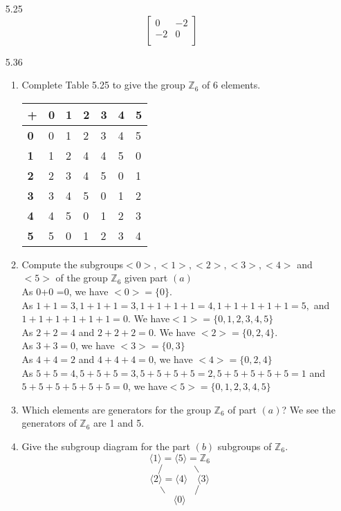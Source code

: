 \documentclass[12pt]{article}
\newcommand{\Z}{\mathds{Z}}
\begin{document}
\begin{enumerate}
		\item[5.25] \[
		\begin{bmatrix}
		0   & -2 \\
		-2   & 0 \\
		\end{bmatrix}
		\]
		\item[5.36] \begin{enumerate}
			\item Complete Table 5.25 to give the group $\Z_6$ of 6 elements.
			\begin{table}[]
				\begin{tabular}{|l|l|l|l|l|l|l|}
					\hline
					+ & \textbf{0} & \textbf{1} & \textbf{2} & \textbf{3} & \textbf{4} & \textbf{5} \\ \hline
					\textbf{0} & 0 & 1 & 2 & 3 & 4 & 5 \\ \hline
					\textbf{1} & 1 & 2 & 4 & 4 & 5 & 0 \\ \hline
					\textbf{2} & 2 & 3 & 4 & 5 & 0 & 1 \\ \hline
					\textbf{3} & 3 & 4 & 5 & 0 & 1 & 2 \\ \hline
					\textbf{4} & 4 & 5 & 0 & 1 & 2 & 3 \\ \hline
					\textbf{5} & 5 & 0 & 1 & 2 & 3 & 4 \\ \hline
				\end{tabular}
			\end{table}
			\item Compute the subgroups$ <0>,<1>,<2>,<3>,<4>$ and $<5>$ of the group $\Z_6$ given part $(a)$\\
				As 0+0 =0, we have $<0> = \{0\}$.\\
				As $1+1=3,1+1+1=3,1+1+1+1=4,1+1+1+1+1=5,$ and $1+1+1+1+1+1=0$. We have$ <1> =  \{0,1,2,3,4,5\} $\\
				As $ 2+2=4 $ and $ 2+2+2=0 $. We have $<2> =  \{0,2,4\} $.\\
				As $ 3+3=0 $, we have $<3> = \{0,3\} $\\
				As $ 4+4=2 $ and $ 4+4+4=0 $, we have $<4> = \{0,2,4\} $\\
				As $ 5+5=4,5+5+5=3,5+5+5+5=2,5+5+5+5+5=1 $ and $ 5+5+5+5+5+5=0 $, we have$ <5> = \{0,1,2,3,4,5\} $
			\item Which elements are generators for the group $\Z_6$ of part $(a)$?
				We see the generators of $ \Z_6 $ are 1 and 5.
			\item Give the subgroup diagram for the part $(b)$ subgroups of $\Z_6$.
				\[\langle1\rangle=\langle5\rangle=\Z_6\]
				\[/ \qquad \quad \backslash \]
				\[\langle2\rangle=\langle4\rangle \quad \langle3\rangle\]
					\[\backslash \qquad \quad / \]
				\[\langle0\rangle\]	
		\end{enumerate}
			

\end{enumerate}
\end{document}
